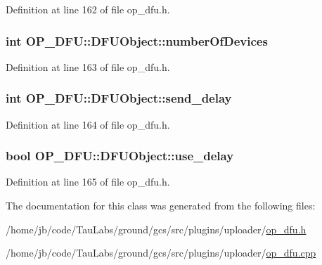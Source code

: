 \-Definition at line 162 of file op\-\_\-dfu.\-h.

\hypertarget{class_o_p___d_f_u_1_1_d_f_u_object_a805f4ba165cc9592522fbc928d06c08d}{
\subsubsection[{number\-Of\-Devices}]{\setlength{\rightskip}{0pt plus 5cm}int {\bf \-O\-P\-\_\-\-D\-F\-U\-::\-D\-F\-U\-Object\-::number\-Of\-Devices}}}\label{class_o_p___d_f_u_1_1_d_f_u_object_a805f4ba165cc9592522fbc928d06c08d}


\-Definition at line 163 of file op\-\_\-dfu.\-h.

\hypertarget{class_o_p___d_f_u_1_1_d_f_u_object_a0a420df742f4528dde9d22a28526a8f3}{
\subsubsection[{send\-\_\-delay}]{\setlength{\rightskip}{0pt plus 5cm}int {\bf \-O\-P\-\_\-\-D\-F\-U\-::\-D\-F\-U\-Object\-::send\-\_\-delay}}}\label{class_o_p___d_f_u_1_1_d_f_u_object_a0a420df742f4528dde9d22a28526a8f3}


\-Definition at line 164 of file op\-\_\-dfu.\-h.

\hypertarget{class_o_p___d_f_u_1_1_d_f_u_object_a5e6ad3fb431eb0220a06c934b13ae276}{
\subsubsection[{use\-\_\-delay}]{\setlength{\rightskip}{0pt plus 5cm}bool {\bf \-O\-P\-\_\-\-D\-F\-U\-::\-D\-F\-U\-Object\-::use\-\_\-delay}}}\label{class_o_p___d_f_u_1_1_d_f_u_object_a5e6ad3fb431eb0220a06c934b13ae276}


\-Definition at line 165 of file op\-\_\-dfu.\-h.



\-The documentation for this class was generated from the following files\-:\begin{DoxyCompactItemize}
\item 
/home/jb/code/\-Tau\-Labs/ground/gcs/src/plugins/uploader/\hyperlink{op__dfu_8h}{op\-\_\-dfu.\-h}\item 
/home/jb/code/\-Tau\-Labs/ground/gcs/src/plugins/uploader/\hyperlink{op__dfu_8cpp}{op\-\_\-dfu.\-cpp}\end{DoxyCompactItemize}
